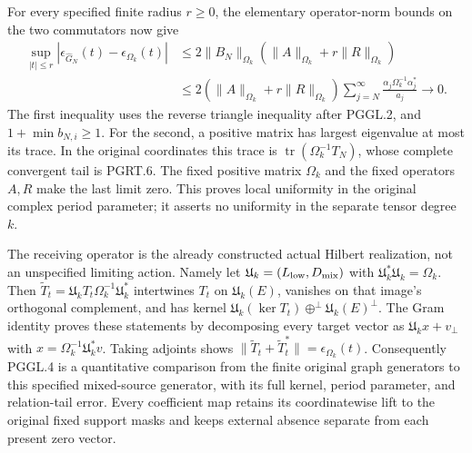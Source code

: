 For every specified finite radius $r\geq0$, the elementary
operator-norm bounds on the two commutators now give
\[
\begin{aligned}
 \sup_{|t|\leq r}|\epsilon_{\widehat G_N}(t)-\epsilon_{\Omega_k}(t)|
 &\leq 2\|B_N\|_{\Omega_k}
                 (\|A\|_{\Omega_k}+r\|R\|_{\Omega_k})\\
 &\leq2(\|A\|_{\Omega_k}+r\|R\|_{\Omega_k})
       \sum_{j=N}^{\infty}
                  \frac{\alpha_j\Omega_k^{-1}\alpha_j^*}{a_j}
 \longrightarrow0.
\end{aligned}
\tag{PGGL.4}\label{GraphV2:eq:pggl-uniform-period-limit}
\]
The first inequality uses the reverse triangle inequality after
PGGL.2, and $1+\min b_{N,i}\geq1$. For the second, a positive
matrix has largest eigenvalue at most its trace. In the original
coordinates this trace is
$\operatorname{tr}(\Omega_k^{-1}T_N)$, whose complete convergent
tail is PGRT.6. The fixed positive matrix $\Omega_k$ and the
fixed operators $A,R$ make the last limit zero. This proves
local uniformity in the original complex period parameter; it
asserts no uniformity in the separate tensor degree $k$.

The receiving operator is the already constructed actual Hilbert
realization, not an unspecified limiting action. Namely let
$\mathfrak U_k=(L_{\rm low},D_{\rm mix})$ with
$\mathfrak U_k^*\mathfrak U_k=\Omega_k$. Then
$\widetilde T_t=\mathfrak U_kT_t\Omega_k^{-1}\mathfrak U_k^*$
intertwines $T_t$ on $\mathfrak U_k(E)$, vanishes on that image's
orthogonal complement, and has kernel
$\mathfrak U_k(\ker T_t)\oplus^\perp\mathfrak U_k(E)^\perp$.
The Gram identity proves these statements by decomposing every
target vector as $\mathfrak U_kx+v_\perp$ with
$x=\Omega_k^{-1}\mathfrak U_k^*v$.
Taking adjoints shows
$\|\widetilde T_t+\widetilde T_t^*\|=\epsilon_{\Omega_k}(t)$.
Consequently PGGL.4 is a quantitative comparison from the finite
original graph generators to this specified mixed-source generator,
with its full kernel, period parameter, and relation-tail error.
Every coefficient map retains its coordinatewise lift to the
original fixed support masks and keeps external absence separate
from each present zero vector.
